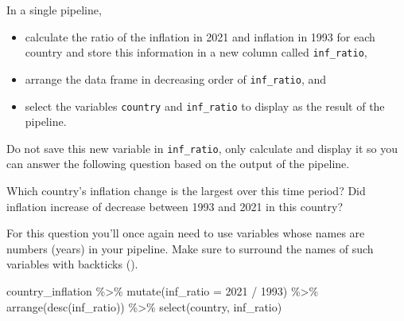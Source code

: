 \documentclass[
  letterpaper,
  DIV=11,
  numbers=noendperiod]{scrartcl}
\newenvironment{Shaded}{\begin{snugshade}}{\end{snugshade}}
\newcommand{\AttributeTok}[1]{\textcolor[rgb]{0.40,0.45,0.13}{#1}}
\newcommand{\FunctionTok}[1]{\textcolor[rgb]{0.28,0.35,0.67}{#1}}
\newcommand{\NormalTok}[1]{\textcolor[rgb]{0.00,0.23,0.31}{#1}}
\newcommand{\SpecialCharTok}[1]{\textcolor[rgb]{0.37,0.37,0.37}{#1}}
\newcommand{\StringTok}[1]{\textcolor[rgb]{0.13,0.47,0.30}{#1}}
\providecommand{\tightlist}{%
  \setlength{\itemsep}{0pt}\setlength{\parskip}{0pt}}
\begin{document}
In a single pipeline,

\begin{itemize}
\tightlist
\item
  calculate the ratio of the inflation in 2021 and inflation in 1993 for
  each country and store this information in a new column called
  \texttt{inf\_ratio},
\item
  arrange the data frame in decreasing order of \texttt{inf\_ratio}, and
\item
  select the variables \texttt{country} and \texttt{inf\_ratio} to
  display as the result of the pipeline.
\end{itemize}

Do not save this new variable in \texttt{inf\_ratio}, only calculate and
display it so you can answer the following question based on the output
of the pipeline.

Which country's inflation change is the largest over this time period?
Did inflation increase of decrease between 1993 and 2021 in this
country?

\begin{tcolorbox}[enhanced jigsaw, toptitle=1mm, bottomrule=.15mm, colbacktitle=quarto-callout-tip-color!10!white, colframe=quarto-callout-tip-color-frame, leftrule=.75mm, breakable, toprule=.15mm, colback=white, arc=.35mm, coltitle=black, left=2mm, opacitybacktitle=0.6, bottomtitle=1mm, opacityback=0, title=\textcolor{quarto-callout-tip-color}{\faLightbulb}\hspace{0.5em}{Tip}, titlerule=0mm, rightrule=.15mm]

For this question you'll once again need to use variables whose names
are numbers (years) in your pipeline. Make sure to surround the names of
such variables with backticks (\texttt{\textasciigrave{}}).

\end{tcolorbox}

\begin{Shaded}
\begin{Highlighting}[]
\NormalTok{country\_inflation }\SpecialCharTok{\%\textgreater{}\%}
  \FunctionTok{mutate}\NormalTok{(}\AttributeTok{inf\_ratio =} \StringTok{\textasciigrave{}}\AttributeTok{2021}\StringTok{\textasciigrave{}} \SpecialCharTok{/} \StringTok{\textasciigrave{}}\AttributeTok{1993}\StringTok{\textasciigrave{}}\NormalTok{) }\SpecialCharTok{\%\textgreater{}\%}
  \FunctionTok{arrange}\NormalTok{(}\FunctionTok{desc}\NormalTok{(inf\_ratio)) }\SpecialCharTok{\%\textgreater{}\%}
  \FunctionTok{select}\NormalTok{(country, inf\_ratio)}
\end{Highlighting}
\end{Shaded}
\end{document}
